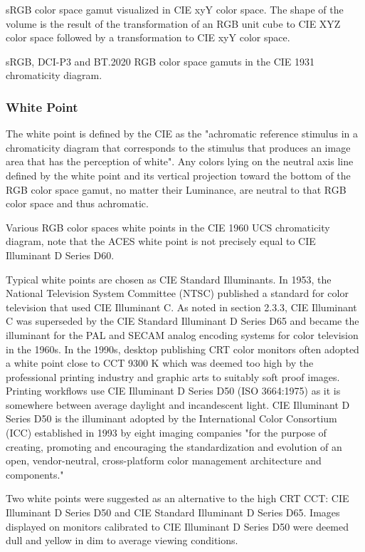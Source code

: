 sRGB color space gamut visualized in CIE xyY color space. The shape of the volume is the result of the transformation of an RGB unit cube to CIE XYZ color space followed by a transformation to CIE xyY color space.


sRGB, DCI-P3 and BT.2020 RGB color space gamuts in the CIE 1931 chromaticity diagram.

\subsubsection{White Point}

The white point is defined by the CIE as the "achromatic reference stimulus in a chromaticity diagram that corresponds to the stimulus that produces an image area that has the perception of white". Any colors lying on the neutral axis line defined by the white point and its vertical projection toward the bottom of the RGB color space gamut, no matter their Luminance, are neutral to that RGB color space and thus achromatic.

Various RGB color spaces white points in the CIE 1960 UCS chromaticity diagram, note that the ACES white point is not precisely equal to CIE Illuminant D Series D60.

Typical white points are chosen as CIE Standard Illuminants. In 1953, the National Television System Committee (NTSC) published a standard for color television that used CIE Illuminant C. As noted in section 2.3.3, CIE Illuminant C was superseded by the CIE Standard Illuminant D Series D65 and became the illuminant for the PAL and SECAM analog encoding systems for color television in the 1960s.
In the 1990s, desktop publishing CRT color monitors often adopted a white point close to CCT 9300 K which was deemed too high by the professional printing industry and graphic arts to suitably soft proof images. Printing workflows use CIE Illuminant D Series D50 (ISO 3664:1975) as it is somewhere between average daylight and incandescent light. CIE Illuminant D Series D50 is the illuminant adopted by the International Color Consortium (ICC) established in 1993 by eight imaging companies "for the purpose of creating, promoting and encouraging the standardization and evolution of an open, vendor-neutral, cross-platform color management architecture and components."

Two white points were suggested as an alternative to the high CRT CCT: CIE Illuminant D Series D50 and CIE Standard Illuminant D Series D65. Images displayed on monitors calibrated to CIE Illuminant D Series D50 were deemed dull and yellow in dim to average viewing conditions.

